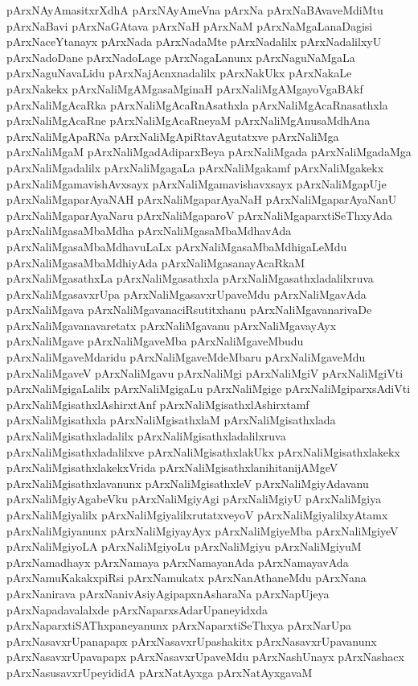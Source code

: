 {pArxNAyAmasitxrXdhA
pArxNAyAmeVna
pArxNa
pArxNaBAvaveMdiMtu
pArxNaBavi
pArxNaGAtava
pArxNaH
pArxNaM
pArxNaMgaLanaDagisi
pArxNaceYtanayx
pArxNada
pArxNadaMte
pArxNadalilx
pArxNadalilxyU
pArxNadoDane
pArxNadoLage
pArxNagaLanunx
pArxNaguNaMgaLa
pArxNaguNavaLidu
pArxNajAcnxnadalilx
pArxNakUkx
pArxNakaLe
pArxNakekx
pArxNaliMgAMgasaMginaH
pArxNaliMgAMgayoVgaBAkf
pArxNaliMgAcaRka
pArxNaliMgAcaRnAsathxla
pArxNaliMgAcaRnasathxla
pArxNaliMgAcaRne
pArxNaliMgAcaRneyaM
pArxNaliMgAnusaMdhAna
pArxNaliMgApaRNa
pArxNaliMgApiRtavAgutatxve
pArxNaliMga
pArxNaliMgaM
pArxNaliMgadAdiparxBeya
pArxNaliMgada
pArxNaliMgadaMga
pArxNaliMgadalilx
pArxNaliMgagaLa
pArxNaliMgakamf
pArxNaliMgakekx
pArxNaliMgamavishAvxsayx
pArxNaliMgamavishavxsayx
pArxNaliMgapUje
pArxNaliMgaparAyaNAH
pArxNaliMgaparAyaNaH
pArxNaliMgaparAyaNanU
pArxNaliMgaparAyaNaru
pArxNaliMgaparoV
pArxNaliMgaparxtiSeThxyAda
pArxNaliMgasaMbaMdha
pArxNaliMgasaMbaMdhavAda
pArxNaliMgasaMbaMdhavuLaLx
pArxNaliMgasaMbaMdhigaLeMdu
pArxNaliMgasaMbaMdhiyAda
pArxNaliMgasanayAcaRkaM
pArxNaliMgasathxLa
pArxNaliMgasathxla
pArxNaliMgasathxladalilxruva
pArxNaliMgasavxrUpa
pArxNaliMgasavxrUpaveMdu
pArxNaliMgavAda
pArxNaliMgava
pArxNaliMgavanaciRsutitxhanu
pArxNaliMgavanarivaDe
pArxNaliMgavanavaretatx
pArxNaliMgavanu
pArxNaliMgavayAyx
pArxNaliMgave
pArxNaliMgaveMba
pArxNaliMgaveMbudu
pArxNaliMgaveMdaridu
pArxNaliMgaveMdeMbaru
pArxNaliMgaveMdu
pArxNaliMgaveV
pArxNaliMgavu
pArxNaliMgi
pArxNaliMgiV
pArxNaliMgiVti
pArxNaliMgigaLalilx
pArxNaliMgigaLu
pArxNaliMgige
pArxNaliMgiparxsAdiVti
pArxNaliMgisathxlAshirxtAnf
pArxNaliMgisathxlAshirxtamf
pArxNaliMgisathxla
pArxNaliMgisathxlaM
pArxNaliMgisathxlada
pArxNaliMgisathxladalilx
pArxNaliMgisathxladalilxruva
pArxNaliMgisathxladalilxve
pArxNaliMgisathxlakUkx
pArxNaliMgisathxlakekx
pArxNaliMgisathxlakekxVrida
pArxNaliMgisathxlanihitanijAMgeV
pArxNaliMgisathxlavanunx
pArxNaliMgisathxleV
pArxNaliMgiyAdavanu
pArxNaliMgiyAgabeVku
pArxNaliMgiyAgi
pArxNaliMgiyU
pArxNaliMgiya
pArxNaliMgiyalilx
pArxNaliMgiyalilxrutatxveyoV
pArxNaliMgiyalilxyAtamx
pArxNaliMgiyanunx
pArxNaliMgiyayAyx
pArxNaliMgiyeMba
pArxNaliMgiyeV
pArxNaliMgiyoLA
pArxNaliMgiyoLu
pArxNaliMgiyu
pArxNaliMgiyuM
pArxNamadhayx
pArxNamaya
pArxNamayanAda
pArxNamayavAda
pArxNamuKakakxpiRsi
pArxNamukatx
pArxNanAthaneMdu
pArxNana
pArxNanirava
pArxNanivAsiyAgipapxnAsharaNa
pArxNapUjeya
pArxNapadavalalxde
pArxNaparxsAdarUpaneyidxda
pArxNaparxtiSAThxpaneyanunx
pArxNaparxtiSeThxya
pArxNarUpa
pArxNasavxrUpanapapx
pArxNasavxrUpashakitx
pArxNasavxrUpavanunx
pArxNasavxrUpavapapx
pArxNasavxrUpaveMdu
pArxNashUnayx
pArxNashacx
pArxNasusavxrUpeyididA
pArxNatAyxga
pArxNatAyxgavaM
}

